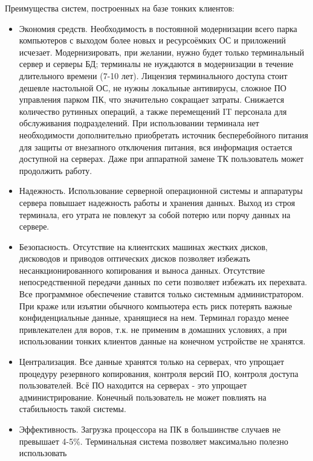 Преимущества систем, построенных на базе тонких клиентов:
\begin{itemize}
    \item   Экономия средств. Необходимость в постоянной модернизации всего парка
        компьютеров с выходом более новых и ресурсоёмких ОС и приложений исчезает.
        Модернизировать, при желании, нужно будет только терминальный сервер и серверы
        БД; терминалы не нуждаются в модернизации в течение длительного времени (7-10
        лет). Лицензия терминального доступа стоит дешевле настольной ОС, не нужны
        локальные антивирусы, сложное ПО управления парком ПК, что значительно сокращает
        затраты. Снижается количество рутинных операций, а также перемещений IT
        персонала для обслуживания подразделений. При использовании терминала нет
        необходимости дополнительно приобретать источник бесперебойного питания для
        защиты от внезапного отключения питания, вся информация остается доступной на
        серверах. Даже при аппаратной замене ТК пользователь может продолжить работу.
    \item   Надежность. Использование серверной операционной системы и аппаратуры
        сервера повышает надежность работы и хранения данных. Выход из строя терминала,
        его утрата не повлекут за собой потерю или порчу данных на сервере.
    \item   Безопасность. Отсутствие на клиентских машинах жестких дисков, дисководов и
        приводов оптических дисков позволяет избежать несанкционированного копирования и
        выноса данных. Отсутствие непосредственной передачи данных по сети позволяет
        избежать их перехвата. Все программное обеспечение ставится только системным
        администратором. При краже или изъятии обычного компьютера есть риск потерять
        важные конфиденциальные данные, хранящиеся на нем. Терминал гораздо менее
        привлекателен для воров, т.к. не применим в домашних условиях, а при
        использовании тонких клиентов данные на конечном устройстве не хранятся.
    \item   Централизация. Все данные хранятся только на серверах, что упрощает
        процедуру резервного копирования, контроля версий ПО, контроля доступа
        пользователей. Всё ПО находится на серверах - это упрощает администрирование.
        Конечный пользователь не может повлиять на стабильность такой системы.
    \item   Эффективность. Загрузка процессора на ПК в большинстве случаев не превышает
        4-5\%. Терминальная система позволяет максимально полезно использовать

\end{itemize}
